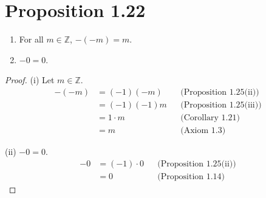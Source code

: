 \section*{Proposition 1.22}
\begin{enumerate}[label=(\roman*)]
    \item For all $m \in \mathbb{Z}$, $-(−m) = m$.
    \item $-0 = 0$.
\end{enumerate}
\begin{proof}
    (i) Let $m \in \mathbb{Z}$.
    \begin{align*}
        -(−m) & = (-1)(-m)  &  & \text{(Proposition 1.25(ii))}  \\
              & = (-1)(-1)m &  & \text{(Proposition 1.25(iii))} \\
              & = 1 \cdot m &  & \text{(Corollary 1.21)}        \\
              & = m         &  & \text{(Axiom 1.3)}
    \end{align*}

    (ii) $-0 = 0$.
    \begin{align*}
        -0 & = (-1) \cdot 0 &  & \text{(Proposition 1.25(ii))} \\
           & = 0            &  & \text{(Proposition 1.14)}
    \end{align*}
\end{proof}

\newpage

